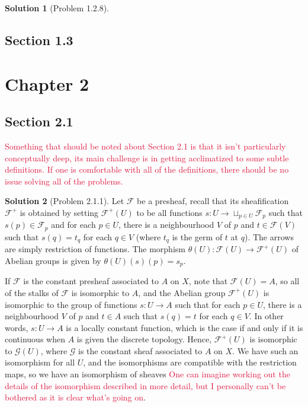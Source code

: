 \documentclass[aps,pra,showpacs,notitlepage,onecolumn,superscriptaddress,nofootinbib]{revtex4-1}
\newcommand{\pop}[1]{\textcolor{crimson}{#1}}
\theoremstyle{definition}
\newtheorem{solution}{Solution}[section]
\begin{document}
\begin{solution}[Problem 1.2.8]

  \end{solution}

\subsection{Section 1.3}

\section{Chapter 2}

\subsection{Section 2.1}

\noindent \pop{Something that should be noted about Section 2.1 is that it isn't particularly conceptually deep, its main challenge is in getting acclimatized to some subtle definitions.
If one is comfortable with all of the definitions, there should be no issue solving all of the problems.}
\newline

\begin{solution}[Problem 2.1.1]
  Let $\mathcal{F}$ be a presheaf, recall that its sheafification $\mathcal{F}^{+}$ is obtained by setting $\mathcal{F}^{+}(U)$ to be all functions $s : U \rightarrow \sqcup_{p \in U} \mathcal{F}_p$
  such that $s(p) \in \mathcal{F}_p$ and for each $p \in U$, there is a neighbourhood $V$ of $p$ and $t \in \mathcal{F}(V)$ such that $s(q) = t_q$ for each $q \in V$ (where $t_q$ is the germ of $t$ at $q$).
  The arrows are simply restriction of functions. The morphism $\theta(U) : \mathcal{F}(U) \rightarrow \mathcal{F}^{+}(U)$ of Abelian groups is given by $\theta(U)(s)(p) = s_p$.

  If $\mathcal{F}$ is the constant presheaf associated to $A$ on $X$, note that $\mathcal{F}(U) = A$, so all of the stalks of $\mathcal{F}$ is isomorphic to $A$, and the Abelian group $\mathcal{F}^{+}(U)$
  is isomorphic to the group of functions $s : U \rightarrow A$ such that for each $p \in U$, there is a neighbourhood $V$ of $p$ and $t \in A$ such that $s(q) = t$ for each $q \in V$. In other words, $s : U \rightarrow A$
  is a locally constant function, which is the case if and only if it is continuous when $A$ is given the discrete topology. Hence, $\mathcal{F}^{+}(U)$ is isomorphic to $\mathcal{G}(U)$, where $\mathcal{G}$ is the
  constant sheaf associated to $A$ on $X$. We have such an isomorphism for all $U$, and the isomorphisms are compatible with the restriction maps, so we have an isomorphism of sheaves \pop{One can imagine working out the details of
    the isomorphism described in more detail, but I personally can't be bothered as it is clear what's going on}.
  \end{solution}
\end{document}
